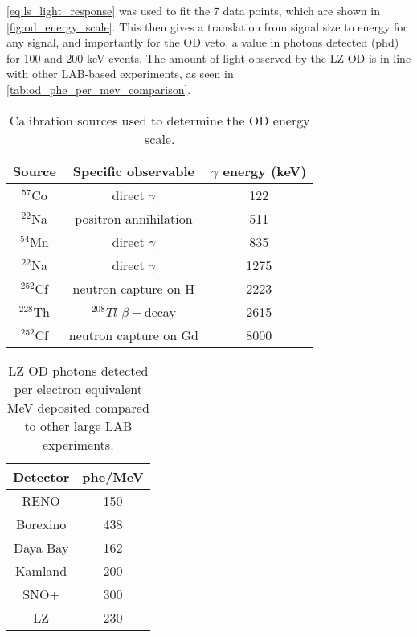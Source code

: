 \par
\autoref{eq:ls_light_response} was used to fit the 7 data points, which are shown in \autoref{fig:od_energy_scale}.
This then gives a translation from signal size to energy for any signal, and importantly for the OD veto, a value in photons detected (phd) for 100 and 200 keV events.
The amount of light observed by the LZ OD is in line with other LAB-based experiments, as seen in \autoref{tab:od_phe_per_mev_comparison}.
\begin{table}[]%
    \centering
    \begin{tabular}{c|c|c}
        Source      & Specific observable         &  $\gamma$ energy (keV) \\ \hline
        ${}^{57}$Co & direct $\gamma$             & 122                        \\
        ${}^{22}$Na & positron annihilation       & 511               \\
        ${}^{54}$Mn & direct $\gamma$             & 835                        \\
        ${}^{22}$Na & direct $\gamma$             & 1275               \\
        ${}^{252}$Cf & neutron capture on H       & 2223            \\
        ${}^{228}$Th & ${}^{208}Tl$ $\beta-$decay & 2615            \\
        ${}^{252}$Cf & neutron capture on Gd      & 8000            
        
    \end{tabular}
    \caption{Calibration sources used to determine the OD energy scale.}
    \label{tab:od_energy_calibration_sources}
\end{table}



\begin{table}[]%
    \centering
    \begin{tabular}{c|c}
        Detector & phe/MeV \\ \hline
        RENO     & 150 \cite{reno_phe_per_mev_ref} \\
        Borexino & 438 \cite{pablo_mosteiro_thesis_ref} \\
        Daya Bay & 162 \cite{dayabay_phe_per_mev_ref} \\
        Kamland  & 200 \cite{kamland_phe_per_mev_ref} \\
        SNO+     & 300 \cite{snoplus_phe_per_mev_ref} \\
        LZ       & 230 
    \end{tabular}
    \caption{LZ OD photons detected per electron equivalent MeV deposited compared to other large LAB experiments.}
    \label{tab:od_phe_per_mev_comparison}
\end{table}

